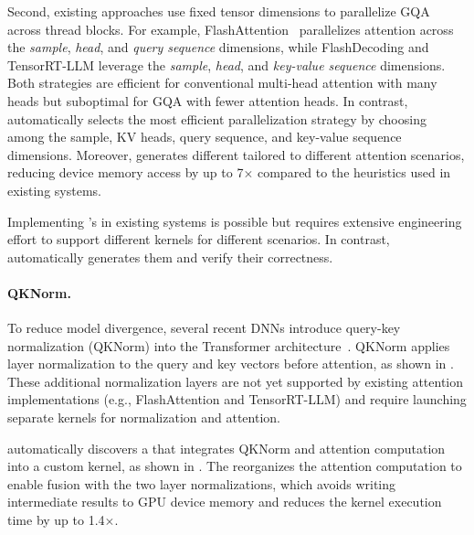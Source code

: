 Second, existing approaches use fixed tensor dimensions to parallelize GQA across thread blocks. For example, FlashAttention~\cite{dao2023flash} parallelizes attention across the {\em sample}, {\em head}, and {\em query sequence} dimensions, while FlashDecoding and TensorRT-LLM leverage the {\em sample}, {\em head}, and {\em key-value sequence} dimensions. Both strategies are efficient for conventional multi-head attention with many heads but suboptimal for GQA with fewer attention heads.
In contrast, \sys automatically selects the most efficient parallelization strategy by choosing among the sample, KV heads, query sequence, and key-value sequence dimensions. Moreover, \sys generates different \graphs tailored to different attention scenarios, reducing device memory access by up to 7$\times$ compared to the heuristics used in existing systems.
%
%

Implementing \sys's \graphs in existing systems is possible but requires extensive engineering effort to support different kernels for different scenarios. In contrast, \sys automatically generates them and verify their correctness.

\paragraph{QKNorm.} To reduce model divergence, several recent DNNs introduce query-key normalization (QKNorm) into the Transformer architecture~\cite{chameleonteam2024chameleon}. QKNorm applies layer normalization to the query and key vectors before attention, as shown in . These additional normalization layers are not yet supported by existing attention implementations (e.g., FlashAttention and TensorRT-LLM) and require launching separate kernels for normalization and attention.

\Sys automatically discovers a \graph that integrates QKNorm and attention computation into a custom kernel, as shown in . The \graph reorganizes the attention computation to enable fusion with the two layer normalizations, which avoids writing intermediate results to GPU device memory and reduces the kernel execution time by up to 1.4$\times$.

